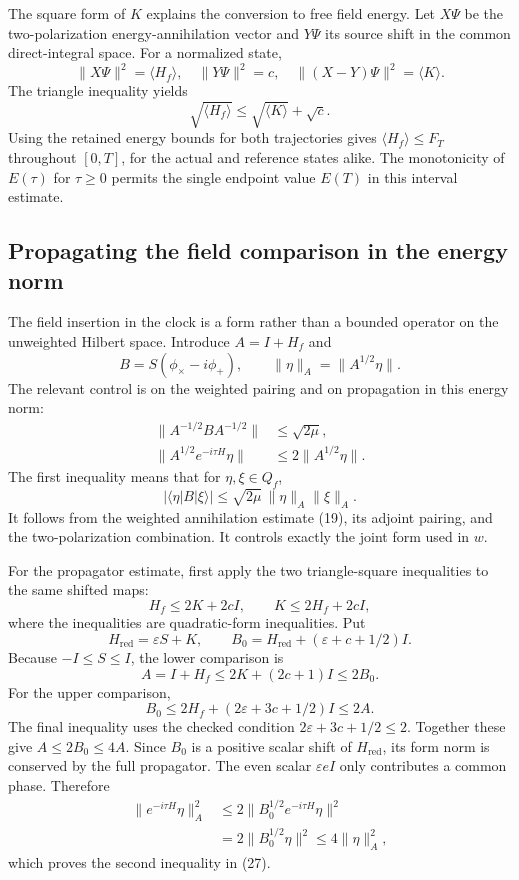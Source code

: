 \documentclass[10pt,twocolumn,letterpaper]{article}
\begin{document}
The square form of $K$ explains the conversion to free field energy. Let $X\Psi$ be the two-polarization energy-annihilation vector and $Y\Psi$ its source shift in the common direct-integral space. For a normalized state,
\[
\|X\Psi\|^2=\langle H_f\rangle,\quad
\|Y\Psi\|^2=c,\quad
\|(X-Y)\Psi\|^2=\langle K\rangle.
\]
The triangle inequality yields
\[
\sqrt{\langle H_f\rangle}
\le\sqrt{\langle K\rangle}+\sqrt c.
\]
Using the retained energy bounds for both trajectories gives $\langle H_f\rangle\le F_T$ throughout $[0,T]$, for the actual and reference states alike. The monotonicity of $E(\tau)$ for $\tau\ge0$ permits the single endpoint value $E(T)$ in this interval estimate.

\subsection{Propagating the field comparison in the energy norm}
The field insertion in the clock is a form rather than a bounded operator on the unweighted Hilbert space. Introduce $A=I+H_f$ and
\[
B=S(\phi_\times-i\phi_+),\qquad
\|\eta\|_A=\|A^{1/2}\eta\|.
\]
The relevant control is on the weighted pairing and on propagation in this energy norm:
\begin{equation}
\begin{aligned}
\|A^{-1/2}BA^{-1/2}\|&\le\sqrt{2\mu},\\
\|A^{1/2}e^{-i\tau H}\eta\|&\le2\|A^{1/2}\eta\|.
\end{aligned}\tag{27}\label{eq:clock-weighted-propagator}
\end{equation}
The first inequality means that for $\eta,\xi\in Q_f$,
\[
|\langle\eta|B|\xi\rangle|
\le\sqrt{2\mu}\,\|\eta\|_A\|\xi\|_A.
\]
It follows from the weighted annihilation estimate (19), its adjoint pairing, and the two-polarization combination. It controls exactly the joint form used in $w$.

For the propagator estimate, first apply the two triangle-square inequalities to the same shifted maps:
\[
H_f\le2K+2cI,\qquad K\le2H_f+2cI,
\]
where the inequalities are quadratic-form inequalities. Put
\[
H_{\mathrm{red}}=\varepsilon S+K,\qquad
B_0=H_{\mathrm{red}}+(\varepsilon+c+1/2)I.
\]
Because $-I\le S\le I$, the lower comparison is
\[
A=I+H_f\le2K+(2c+1)I\le2B_0.
\]
For the upper comparison,
\[
B_0\le2H_f+(2\varepsilon+3c+1/2)I\le2A.
\]
The final inequality uses the checked condition $2\varepsilon+3c+1/2\le2$. Together these give $A\le2B_0\le4A$. Since $B_0$ is a positive scalar shift of $H_{\mathrm{red}}$, its form norm is conserved by the full propagator. The even scalar $\varepsilon eI$ only contributes a common phase. Therefore
\[
\begin{aligned}
\|e^{-i\tau H}\eta\|_A^2
&\le2\|B_0^{1/2}e^{-i\tau H}\eta\|^2\\
&=2\|B_0^{1/2}\eta\|^2
\le4\|\eta\|_A^2,
\end{aligned}
\]
which proves the second inequality in (27).
\end{document}

